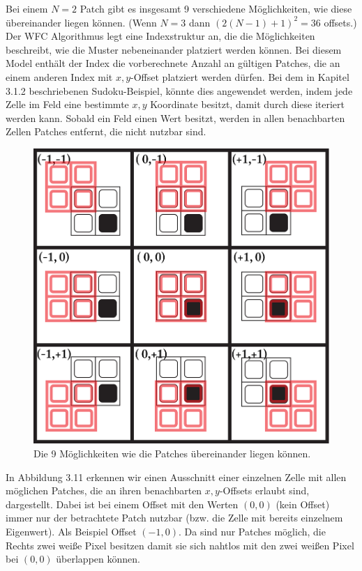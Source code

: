 \documentclass[12pt, a4paper,twoside,openright]{report} %
\begin{document}
Bei einem $N = 2$ Patch gibt es insgesamt 9 verschiedene Möglichkeiten, wie diese übereinander liegen können.
{(Wenn $N = 3$ dann $(2(N - 1) + 1)^2 = 36$ offsets.)}
Der WFC Algorithmus legt eine Indexstruktur an, die die Möglichkeiten beschreibt, wie die Muster nebeneinander platziert werden können.
Bei diesem Model enthält der Index die vorberechnete Anzahl an gültigen Patches, die an einem anderen Index mit $x,y$-Offset platziert werden dürfen. 
Bei dem in Kapitel 3.1.2 beschriebenen Sudoku-Beispiel, könnte dies angewendet werden,
indem jede Zelle im Feld eine bestimmte $x,y$ Koordinate besitzt, damit durch diese iteriert werden kann.
Sobald ein Feld einen Wert besitzt, werden in allen benachbarten Zellen Patches entfernt, die nicht nutzbar sind. \cite{Karth2017WaveFunctionCollapseIC}

\begin{figure}[H]
    \centering
    \includegraphics[width=0.5\linewidth]{images/red-maze-offset.png}%
    \caption{Die 9 Möglichkeiten wie die Patches übereinander liegen können. \cite{Karth2017WaveFunctionCollapseIC}}%
\end{figure}

In Abbildung 3.11 erkennen wir einen Ausschnitt einer einzelnen Zelle mit allen möglichen Patches, die an ihren benachbarten $x,y$-Offsets erlaubt sind, dargestellt.
Dabei ist bei einem Offset mit den Werten $(0,0)$ {(kein Offset)} immer nur der betrachtete Patch nutzbar {(bzw. die Zelle mit bereits einzelnem Eigenwert)}.
Als Beispiel Offset $(-1,0)$. Da sind nur Patches möglich, die Rechts zwei weiße Pixel besitzen damit sie sich nahtlos mit den zwei weißen Pixel bei $(0,0)$ überlappen können. \cite{Karth2017WaveFunctionCollapseIC}
\end{document}
